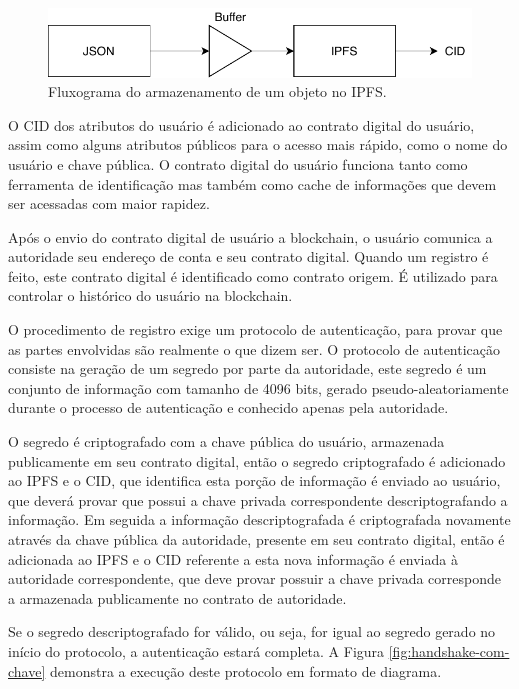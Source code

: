 \documentclass[tcc,capa]{texufpel}
\begin{document}
        \begin{figure}[h!]
            \centering
            \includegraphics[width=15cm]{fluxograma-armazenamento-ipfs.pdf}
            \caption{Fluxograma do armazenamento de um objeto no IPFS.}
            \label{fig:fluxograma-ipfs}
        \end{figure}
        
        O CID dos atributos do usuário é adicionado ao contrato digital do usuário, assim como alguns atributos públicos para o acesso mais rápido, como o nome do usuário e chave pública. O contrato digital do usuário funciona tanto como ferramenta de identificação mas também como cache de informações que devem ser acessadas com maior rapidez.
        
        Após o envio do contrato digital de usuário a blockchain, o usuário comunica a autoridade seu endereço de conta e seu contrato digital. Quando um registro é feito, este contrato digital é identificado como contrato origem. É utilizado para controlar o histórico do usuário na blockchain. 
        
        O procedimento de registro exige um protocolo de autenticação, para provar que as partes envolvidas são realmente o que dizem ser. O protocolo de autenticação consiste na geração de um segredo por parte da autoridade, este segredo é um conjunto de informação com tamanho de 4096 bits, gerado pseudo-aleatoriamente durante o processo de autenticação e conhecido apenas pela autoridade.
        
        O segredo é criptografado com a chave pública do usuário, armazenada publicamente em seu contrato digital, então o segredo criptografado é adicionado ao IPFS e o CID, que identifica esta porção de informação é enviado ao usuário, que deverá provar que possui a chave privada correspondente descriptografando a informação. Em seguida a informação descriptografada é criptografada novamente através da chave pública da autoridade, presente em seu contrato digital, então é adicionada ao IPFS e o CID referente a esta nova informação é enviada à autoridade correspondente, que deve provar possuir a chave privada corresponde a armazenada publicamente no contrato de autoridade.
        
        Se o segredo descriptografado for válido, ou seja, for igual ao segredo gerado no início do protocolo, a autenticação estará completa. A Figura \ref{fig:handshake-com-chave} demonstra a execução deste protocolo em formato de diagrama.
\end{document}

